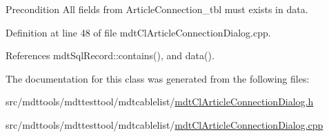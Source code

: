 \begin{DoxyPrecond}{Precondition}
All fields from Article\-Connection\-\_\-tbl must exists in data. 
\end{DoxyPrecond}


Definition at line 48 of file mdt\-Cl\-Article\-Connection\-Dialog.\-cpp.



References mdt\-Sql\-Record\-::contains(), and data().



The documentation for this class was generated from the following files\-:\begin{DoxyCompactItemize}
\item 
src/mdttools/mdttesttool/mdtcablelist/\hyperlink{mdt_cl_article_connection_dialog_8h}{mdt\-Cl\-Article\-Connection\-Dialog.\-h}\item 
src/mdttools/mdttesttool/mdtcablelist/\hyperlink{mdt_cl_article_connection_dialog_8cpp}{mdt\-Cl\-Article\-Connection\-Dialog.\-cpp}\end{DoxyCompactItemize}
